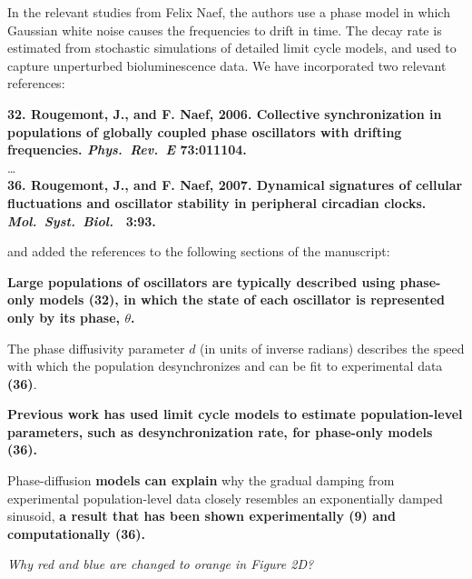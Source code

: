 \documentclass[11pt, letterpaper]{article}
\newenvironment{reviewer}{\itshape\color{gray}}{}
\newenvironment{manuscript}[1]{\begin{center}\begin{tcolorbox}[colback=green!5!white,colframe=green!75!black,width=0.8\textwidth,title={#1},breakable,fonttitle=\bfseries]}{\end{tcolorbox}\end{center}}
\begin{document}
In the relevant studies from Felix Naef, the authors use a phase model in which Gaussian white noise causes the frequencies to drift in time.
The decay rate is estimated from stochastic simulations of detailed limit cycle models, and used to capture unperturbed bioluminescence data.
We have incorporated two relevant references:

\begin{manuscript}{Page 21}
{\bfseries
32. Rougemont, J., and F. Naef, 2006. Collective synchronization in populations
of globally coupled phase oscillators with drifting frequencies. {\itshape Phys.\ Rev.\ E} 73:011104.\\}
\dots\\
{\bfseries
  36. Rougemont, J., and F. Naef, 2007. Dynamical signatures of cellular fluctuations and oscillator stability in peripheral circadian clocks. {\itshape Mol.\ Syst.\ Biol.\ } 3:93. }
\end{manuscript}

and added the references to the following sections of the manuscript:

\begin{manuscript}{Page 5}
\bfseries
Large populations of oscillators are typically described using phase-only models (32), in which the state of each oscillator is represented only by its phase, $\theta$.
\end{manuscript}
\begin{manuscript}{Page 6}
The phase diffusivity parameter $d$ (in units of inverse radians) describes the speed with which the population desynchronizes and can be fit to experimental data {\bfseries (36)}.
\end{manuscript}
\begin{manuscript}{Page 11}
\bfseries
Previous work has used limit cycle models to estimate population-level parameters, such as desynchronization rate, for phase-only models (36).
\end{manuscript}
\begin{manuscript}{Page 12}
  Phase-diffusion {\bfseries models can explain} why the gradual damping from experimental population-level data closely resembles an exponentially damped sinusoid, {\bfseries a result that has been shown experimentally (9) and computationally (36).}
\end{manuscript}

\begin{reviewer}
Why red and blue are changed to orange in Figure 2D? 
\end{reviewer}
 
\end{document}
